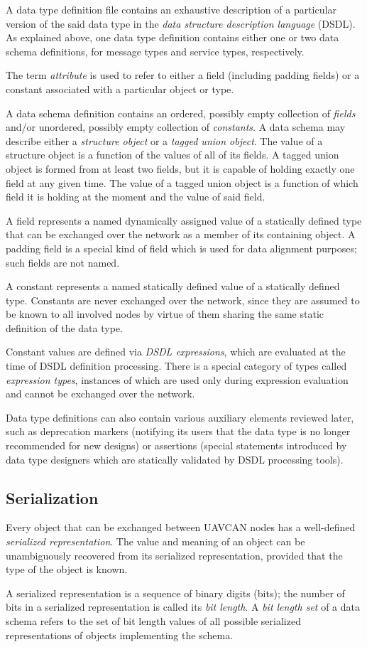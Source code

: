 A data type definition file contains an exhaustive description of a particular version of the said data type in the
\emph{data structure description language} (DSDL).
As explained above, one data type definition contains either one or two data schema definitions,
for message types and service types, respectively.

The term \emph{attribute} is used to refer to either a field (including padding fields) or a constant
associated with a particular object or type.

A data schema definition contains an ordered, possibly empty collection of \emph{fields} and/or
unordered, possibly empty collection of \emph{constants}.
A data schema may describe either a \emph{structure object} or a \emph{tagged union object}.
The value of a structure object is a function of the values of all of its fields.
A tagged union object is formed from at least two fields,
but it is capable of holding exactly one field at any given time.
The value of a tagged union object is a function of which field it is holding at the moment and the value of said field.

A field represents a named dynamically assigned value of a statically defined type
that can be exchanged over the network as a member of its containing object.
A padding field is a special kind of field which is used for data alignment purposes;
such fields are not named.

A constant represents a named statically defined value of a statically defined type.
Constants are never exchanged over the network, since they are assumed to be known to all involved nodes
by virtue of them sharing the same static definition of the data type.

Constant values are defined via \emph{DSDL expressions},
which are evaluated at the time of DSDL definition processing.
There is a special category of types called \emph{expression types},
instances of which are used only during expression evaluation
and cannot be exchanged over the network.

Data type definitions can also contain various auxiliary elements reviewed later,
such as deprecation markers (notifying its users that the data type is no longer recommended for new designs)
or assertions (special statements introduced by data type designers
which are statically validated by DSDL processing tools).

\subsection{Serialization}

Every object that can be exchanged between UAVCAN nodes has a well-defined \emph{serialized representation}.
The value and meaning of an object can be unambiguously recovered from its serialized representation,
provided that the type of the object is known.

\label{sec:dsdl_bit_length_set}
A serialized representation is a sequence of binary digits (bits);
the number of bits in a serialized representation is called its \emph{bit length}.
A \emph{bit length set} of a data schema refers to the set of bit length values of all possible
serialized representations of objects implementing the schema.
